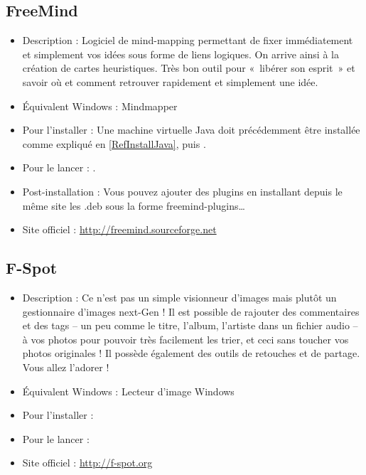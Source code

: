 \subsection{FreeMind}
\begin{itemize}
\begingroup
{}
\item Description : Logiciel de mind-mapping permettant de fixer immédiatement et simplement vos idées sous forme de liens logiques. On arrive ainsi à la création de cartes heuristiques. Très bon outil pour «~libérer son esprit~» et savoir où et comment retrouver rapidement et simplement une idée.{\par}
\endgroup
\item Équivalent Windows : Mindmapper{\par}
\item Pour l'installer : Une machine virtuelle Java doit précédemment être installée comme expliqué en \ref{RefInstallJava}, puis .{\par}
\item Pour le lancer : .{\par}
\item Post-installation : Vous pouvez ajouter des plugins en installant depuis le même site les .deb sous la forme freemind-plugins\ldots{}{\par}
\item Site officiel : \url{http://freemind.sourceforge.net}{\par}
\end{itemize}
\subsection{F-Spot}
\label{RefF-Spot}
\begin{itemize}
\begingroup
{}
\item Description : Ce n'est pas un simple visionneur d'images mais plutôt un gestionnaire d'images next-Gen ! Il est possible de rajouter des commentaires et des tags -- un peu comme le titre, l'album, l'artiste dans un fichier audio -- à vos photos pour pouvoir très facilement les trier, et ceci sans toucher vos photos originales ! Il possède également des outils de retouches et de partage. Vous allez l'adorer !{\par}
\item Équivalent Windows : Lecteur d'image Windows{\par}
\item Pour l'installer : 
\item Pour le lancer : 
\item Site officiel : \url{http://f-spot.org}{\par}
\endgroup
\end{itemize}

